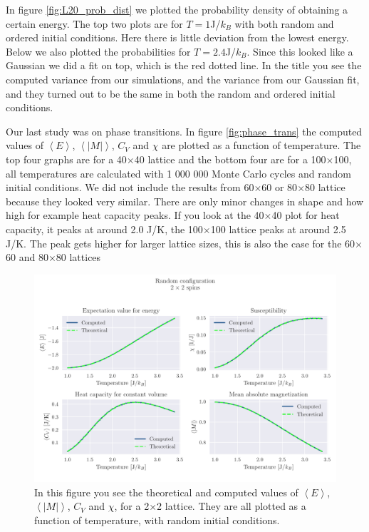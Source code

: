 \documentclass[reprint, english,notitlepage,nofootinbib]{revtex4-1}  %
\begin{document}
In figure \ref{fig:L20_prob_dist} we plotted the probability density of obtaining a certain energy. The top two plots are for $T = 1$J/$k_B$ with both random and ordered initial conditions. Here there is little deviation from the lowest energy. Below we also plotted the probabilities for $T = 2.4$J/$k_B$. Since this looked like a Gaussian we did a fit on top, which is the red dotted line. In the title you see the computed variance from our simulations, and the variance from our Gaussian fit, and they turned out to be the same in both the random and ordered initial conditions.

Our last study was on phase transitions. In figure \ref{fig:phase_trans} the computed values of $\left<E\right>$, $\left<|M|\right>$, $C_V$ and $\chi$ are plotted as a function of temperature. The top four graphs are for a 40$\times$40 lattice and the bottom four are for a 100$\times$100, all temperatures are calculated with 1 000 000 Monte Carlo cycles and random initial conditions. We did not include the results from 60$\times$60 or 80$\times$80 lattice because they looked very similar. There are only minor changes in shape and how high for example heat capacity peaks. If you look at the 40$\times$40 plot for heat capacity, it peaks at around 2.0 J/K, the 100$\times$100 lattice peaks at around 2.5 J/K. The peak gets higher for larger lattice sizes, this is also the case for the 60$\times$60 and 80$\times$80 lattices

\begin{figure}[!htb]
	\includegraphics[width=\linewidth]{../output/c/L2-T1-dT0_01-NT240-N6-RandomFalse-CompTemp.pdf}
	\caption{In this figure you see the theoretical and computed values of $\left<E\right>$, $\left<|M|\right>$, $C_V$ and $\chi$, for a 2$\times$2 lattice. They are all plotted as a function of temperature, with random initial conditions.}
	\label{fig:L2_Random}
\end{figure}
\end{document}
